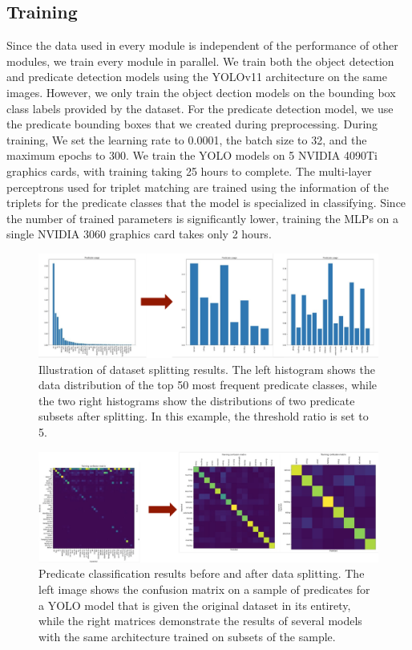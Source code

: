 \documentclass{article}
\begin{document}
\subsection{Training}
Since the data used in every module is independent of the performance of other modules, we train every module in parallel. 
We train both the object detection and predicate detection models using the YOLOv11 architecture on the same images. However, we only train the object dection models on the bounding box class labels provided by the dataset. For the predicate detection model, we use the predicate bounding boxes that we created during preprocessing. During training, We set the learning rate to 0.0001, the batch size to 32, and the maximum epochs to 300. We train the YOLO models on 5 NVIDIA 4090Ti graphics cards, with training taking 25 hours to complete. The multi-layer perceptrons used for triplet matching are trained using the information of the triplets for the predicate classes that the model is specialized in classifying. Since the number of trained parameters is significantly lower, training the MLPs on a single NVIDIA 3060 graphics card takes only 2 hours.

\begin{figure}
    \includegraphics[width=\textwidth]{figures/figure2.png}
  \centering
  \caption{Illustration of dataset splitting results. The left histogram shows the data distribution of the top 50 most frequent predicate classes, while the two right histograms show the distributions of two predicate subsets after splitting. In this example, the threshold ratio is set to 5.}
\end{figure}

\begin{figure}
    \includegraphics[width=\textwidth]{figures/figure3.png}
  \centering
  \caption{Predicate classification results before and after data splitting. The left image shows the confusion matrix on a sample of predicates for a YOLO model that is given the original dataset in its entirety, while the right matrices demonstrate the results of several models with the same architecture trained on subsets of the sample.}
\end{figure}
\end{document}
